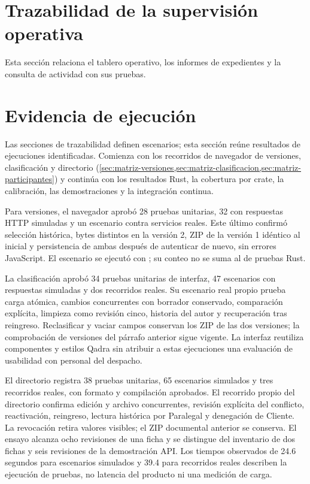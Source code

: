 

\section{Trazabilidad de la supervisión operativa}\label{sec:matriz-grupo-supervision}

Esta sección relaciona el tablero operativo, los informes de expedientes y la consulta de actividad con sus pruebas.







\section{Evidencia de ejecución}\label{sec:matriz-evidencia}

Las secciones de trazabilidad definen escenarios; esta sección reúne resultados de ejecuciones identificadas. Comienza con los recorridos de navegador de versiones, clasificación y directorio (\cref{sec:matriz-versiones,sec:matriz-clasificacion,sec:matriz-participantes}) y continúa con los resultados Rust, la cobertura por crate, la calibración, las demostraciones y la integración continua.

Para versiones, el navegador aprobó 28 pruebas unitarias, 32 con respuestas HTTP simuladas y un escenario contra servicios reales. Este último confirmó selección histórica, bytes distintos en la versión 2, ZIP de la versión 1 idéntico al inicial y persistencia de ambas después de autenticar de nuevo, sin errores JavaScript. El escenario se ejecutó con ; su conteo no se suma al de pruebas Rust.

La clasificación aprobó 34 pruebas unitarias de interfaz, 47 escenarios con respuestas simuladas y dos recorridos reales. Su escenario real propio prueba carga atómica, cambios concurrentes con borrador conservado, comparación explícita, limpieza como revisión cinco, historia del autor y recuperación tras reingreso. Reclasificar y vaciar campos conservan los ZIP de las dos versiones; la comprobación de versiones del párrafo anterior sigue vigente. La interfaz reutiliza componentes y estilos Qadra sin atribuir a estas ejecuciones una evaluación de usabilidad con personal del despacho.

{ El directorio registra 38 pruebas unitarias, 65 escenarios simulados y tres recorridos reales, con formato y compilación aprobados. El recorrido propio del directorio confirma edición y archivo concurrentes, revisión explícita del conflicto, reactivación, reingreso, lectura histórica por Paralegal y denegación de Cliente. La revocación retira valores visibles; el ZIP documental anterior se conserva. El ensayo alcanza ocho revisiones de una ficha y se distingue del inventario de dos fichas y seis revisiones de la demostración API. Los tiempos observados de 24.6 segundos para escenarios simulados y 39.4 para recorridos reales describen la ejecución de pruebas, no latencia del producto ni una medición de carga.\par}

